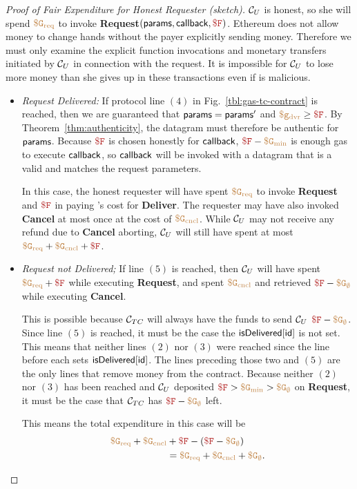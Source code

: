 \begin{proof}[Proof of Fair Expenditure for Honest Requester (sketch)]
${\cal C}_U$ is honest, so she will spend $\tt {\color{brown} \$G_\text{req} }$ to invoke {\bf Request}$(\dgform, \dgcallback, \consthonestfee)$.
Ethereum does not allow money to change hands without the payer explicitly sending money.
Therefore we must only examine the explicit function invocations and monetary transfers initiated by ${\cal C}_U$ in connection with the request.
It is impossible for ${\cal C}_U$ to lose more money than she gives up in these transactions even if \tc is malicious.

\begin{itemize}
\item {\it Request Delivered:}
If protocol line $(4)$ in Fig.~\ref{tbl:gas-tc-contract} is reached,
then we are guaranteed that ${\sf params} = {\sf params}'$ and $\gasdeliver \geq \consthonestfee$.
By Theorem~\ref{thm:authenticity}, the datagram must therefore be authentic for ${\sf params}$.
Because $\consthonestfee$ is chosen honestly for ${\sf callback}$, $\consthonestfee - \constgasmin$ is enough gas to execute ${\sf callback}$,
so ${\sf callback}$ will be invoked with a datagram that is a valid and matches the request parameters.

In this case, the honest requester will have spent $\tt {\color{brown} \$G_\text{req} }$ to invoke {\bf Request} and $\consthonestfee$ in paying \tc's cost for {\bf Deliver}.
The requester may have also invoked {\bf Cancel} at most once at the cost of $\tt {\color{brown} \$G_\text{cncl} }$.
While ${\cal C}_U$ may not receive any refund due to {\bf Cancel} aborting, ${\cal C}_U$ will still have spent at most $\constgasrequest + \constgasinvokecancel + \consthonestfee$.


\item {\it Request not Delivered;}
If line $(5)$ is reached, then ${\cal C}_U$ will have spent
$\constgasrequest + \consthonestfee$ while executing {\bf Request},
and spent $\tt {\color{brown} \$G_\text{cncl} }$ and retrieved $\consthonestfee - \constgascancel$ while executing {\bf Cancel}.

This is possible because ${\cal C}_{TC}$ will always have the funds to send ${\cal C}_U$ $\consthonestfee - \constgascancel$.
Since line $(5)$ is reached, it must be the case the ${\sf isDelivered}[{\sf id}]$ is not set.
This means that neither lines $(2)$ nor $(3)$ were reached since the line before each sets ${\sf isDelivered}[{\sf id}]$.
The lines preceding those two and $(5)$ are the only lines that remove money from the contract.
Because neither $(2)$ nor $(3)$ has been reached and ${\cal C}_U$ deposited $\consthonestfee > \constgasmin > \constgascancel$ on {\bf Request},
it must be the case that ${\cal C}_{TC}$ has $\consthonestfee - \constgascancel$ left.

This means the total expenditure in this case will be
\begin{align*}
  \constgasrequest + \constgasinvokecancel & + \consthonestfee - (\consthonestfee - \constgascancel) \\
                                           & = \constgasrequest + \constgasinvokecancel + \constgascancel.
\end{align*}
\end{itemize}
\end{proof}

